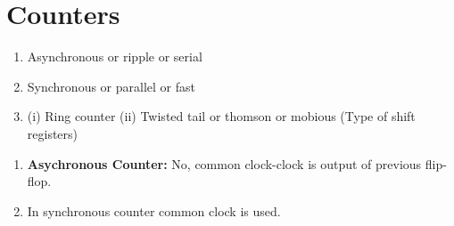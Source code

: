  	\section{Counters}
 	\begin{enumerate}
 		\item Asynchronous or ripple or serial 
 		\item Synchronous or parallel or fast
 		\item (i) Ring counter (ii) Twisted tail or thomson or mobious (Type of shift registers)
 	\end{enumerate}
 \begin{enumerate}
 	\item \textbf{Asychronous Counter:} No, common clock-clock is output of previous flip-flop.
 	\item In synchronous counter common clock is used.
 \end{enumerate}
